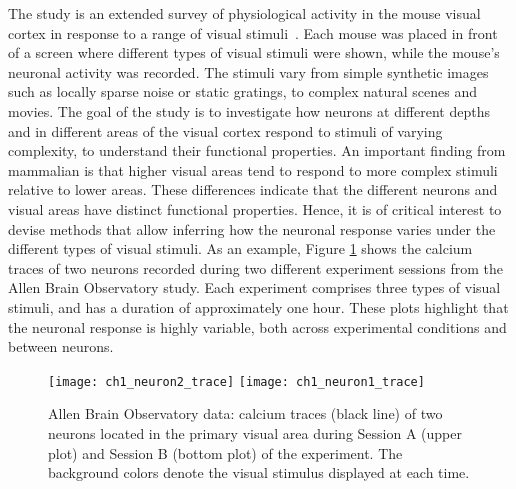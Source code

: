 The study is an extended survey of physiological activity in the mouse visual cortex in response to a range of visual stimuli~\parencite{allen_stimulus}. Each mouse was placed in front of a screen where different types of visual stimuli were shown, while the mouse’s neuronal activity was recorded. The stimuli vary from simple synthetic images such as locally sparse noise or static gratings, to complex natural scenes and movies.
The goal of the study is to investigate how neurons at different depths and in different areas of the visual cortex respond to stimuli of varying complexity, to understand their functional properties. %
An important finding from mammalian is that higher visual areas tend to respond to more complex stimuli relative to lower areas. These differences indicate that the different neurons and visual areas have distinct functional properties.
Hence, it is of critical interest to devise methods that allow inferring how the neuronal response varies under the different types of visual stimuli. %
As an example, Figure \ref{ch1_fig:trace_neurons} shows the calcium traces of two neurons recorded during two different experiment sessions from the Allen Brain Observatory study.
Each experiment comprises three types of visual stimuli, and has a duration of approximately one hour.
These plots highlight that the neuronal response is highly variable, both across experimental conditions and between neurons.

\begin{figure}
	\centering
	\texttt{[image: ch1\_neuron2\_trace]}
	\centering
	\texttt{[image: ch1\_neuron1\_trace]}
	\caption[Calcium traces of two neurons from the Allen Brain Observatory data.]{Allen Brain Observatory data: calcium traces (black line) of two neurons located in the primary visual area during Session A (upper plot) and Session B (bottom plot) of the experiment. The background colors denote the visual stimulus displayed at each time.}\label{ch1_fig:trace_neurons}
\end{figure}

